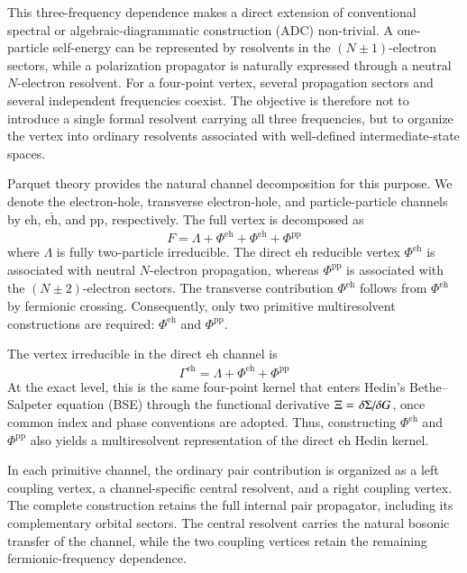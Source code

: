 \documentclass[aip,jcp,reprint,noshowkeys,superscriptaddress]{revtex4-1}
\newcommand{\eh}{\text{eh}}
\newcommand{\teh}{\overline{\text{eh}}}
\newcommand{\pp}{\text{pp}}
\begin{document}
This three-frequency dependence makes a direct extension of conventional
spectral or algebraic-diagrammatic construction (ADC) non-trivial.
A one-particle self-energy can be represented by resolvents in the
$(N\pm1)$-electron sectors, while a polarization propagator is naturally
expressed through a neutral $N$-electron resolvent.
For a four-point vertex, several propagation sectors and several independent
frequencies coexist.
The objective is therefore not to introduce a single formal resolvent
carrying all three frequencies, but to organize the vertex into ordinary
resolvents associated with well-defined intermediate-state spaces.

Parquet theory provides the natural channel decomposition for this purpose.
We denote the electron-hole, transverse electron-hole, and particle-particle
channels by $\eh$, $\teh$, and $\pp$, respectively.
The full vertex is decomposed as\cite{DeDominicis_1964b,Bickers_2004,Eckhardt2023,KuglerVonDelft2018,MarieLoos2025}
\begin{equation}
	F
	=
	\Lambda
	+
	\Phi^\eh
	+
	\Phi^{\teh}
	+
	\Phi^\pp
	\label{eq:parquet_decomposition}
\end{equation}
where $\Lambda$ is fully two-particle irreducible.
The direct $\eh$ reducible vertex $\Phi^\eh$ is associated with neutral
$N$-electron propagation, whereas $\Phi^\pp$ is associated with the
$(N\pm2)$-electron sectors.
The transverse contribution $\Phi^{\teh}$ follows from $\Phi^\eh$ by
fermionic crossing.
Consequently, only two primitive multiresolvent constructions are required:
$\Phi^\eh$ and $\Phi^\pp$.

The vertex irreducible in the direct $\eh$ channel is
\begin{equation}
	\Gamma^\eh
	=
	\Lambda
	+
	\Phi^{\teh}
	+
	\Phi^\pp
	\label{eq:Gamma_eh_parquet}
\end{equation}
At the exact level, this is the same four-point kernel that enters Hedin's
Bethe--Salpeter equation (BSE) through the functional derivative
$\Xi=\fdv*{\Sigma}{G}$, once common index and phase conventions are adopted.\cite{Hedin1965,Onida2002,StarkeKresse2012,MarieAmmarLoos2024}
Thus, constructing $\Phi^\eh$ and $\Phi^\pp$ also yields a multiresolvent
representation of the direct $\eh$ Hedin kernel.

In each primitive channel, the ordinary pair contribution is organized
as a left coupling vertex, a channel-specific central resolvent,
and a right coupling vertex. The complete construction retains the full
internal pair propagator, including its complementary orbital sectors.
The central resolvent carries the natural bosonic transfer of the channel,
while the two coupling vertices retain the remaining fermionic-frequency
dependence.
\end{document}
